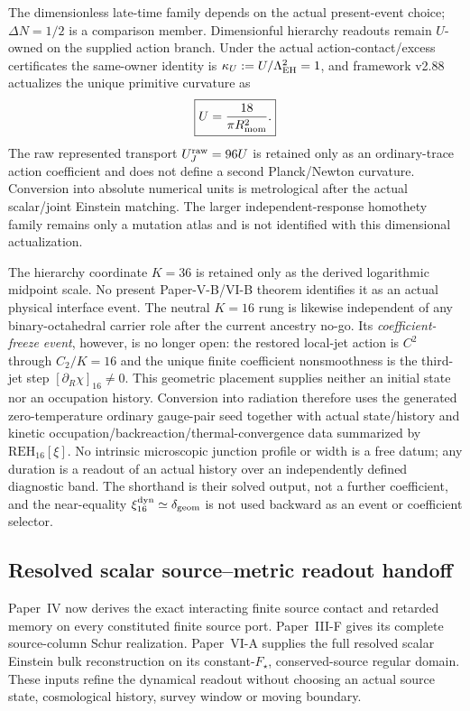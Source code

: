\documentclass[12pt,a4paper]{article}
\begin{document}
The dimensionless late-time family depends on the actual present-event
choice; $\Delta N=1/2$ is a comparison member. Dimensionful hierarchy
readouts remain $U$-owned on the supplied action branch. Under the actual
action-contact/excess certificates the same-owner identity is
\(\kappa_U:=U/\Lambda_{\rm EH}^2=1\), and framework v2.88 actualizes the unique primitive curvature as
\[
 \boxed{U=\frac{18}{\pi R_{\mathrm{mom}}^2}.}
\]
The raw represented transport \(U_J^{\rm raw}=96U\) is retained only as an ordinary-trace action coefficient and does not define a second Planck/Newton curvature.  Conversion into absolute numerical units is metrological after the actual
scalar/joint Einstein matching.  The larger independent-response homothety family remains only a mutation atlas and is not identified with this dimensional actualization.

The hierarchy coordinate $K=36$ is retained only as the derived logarithmic
midpoint scale.  No present Paper-V-B/VI-B theorem identifies it as an actual
physical interface event.  The neutral $K=16$ rung is likewise independent of
any binary-octahedral carrier role after the current ancestry no-go.  Its \emph{coefficient-freeze event}, however, is no longer open: the
restored local-jet action is \(C^2\) through \(C_2/K=16\) and the unique
finite coefficient nonsmoothness is the third-jet step
\([\partial_R\chi]_{16}\ne0\).  This geometric placement supplies neither an initial state nor
an occupation history.  Conversion into radiation therefore uses the generated zero-temperature
ordinary gauge-pair seed together with actual state/history and kinetic
occupation/backreaction/thermal-convergence data summarized by
\(\mathrm{REH}_{16}[\xi]\).  No intrinsic microscopic
junction profile or width is a free datum; any duration is a readout of an
actual history over an independently defined diagnostic band.  The shorthand is
their solved output, not a further coefficient, and the near-equality
\(\xi_{16}^{\rm dyn}\simeq\delta_{\rm geom}\) is not used backward as an event or
coefficient selector.


\subsection{Resolved scalar source--metric readout handoff}
\label{p9:sec:v1108-full-scalar-readout}

Paper~IV now derives the exact interacting finite source contact and retarded
memory on every constituted finite source port.  Paper~III-F gives its complete
source-column Schur realization.  Paper~VI-A supplies the full resolved scalar
Einstein bulk reconstruction on its constant-$F_\star$, conserved-source
regular domain.  These inputs refine the dynamical readout without choosing
an actual source state, cosmological history, survey window or moving boundary.
\end{document}
